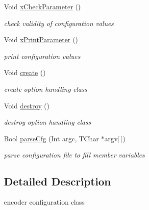\begin{DoxyCompactItemize}
\item 
\mbox{\label{class_t_app_enc_cfg_a6119ea47ef5786407b9fd44decbcac18}} 
Void \hyperlink{class_t_app_enc_cfg_a6119ea47ef5786407b9fd44decbcac18}{x\+Check\+Parameter} ()
\begin{DoxyCompactList}\small\item\em check validity of configuration values \end{DoxyCompactList}\item 
\mbox{\label{class_t_app_enc_cfg_a7c71b043b2008c953ad055ef0aa203bd}} 
Void \hyperlink{class_t_app_enc_cfg_a7c71b043b2008c953ad055ef0aa203bd}{x\+Print\+Parameter} ()
\begin{DoxyCompactList}\small\item\em print configuration values \end{DoxyCompactList}\item 
\mbox{\label{class_t_app_enc_cfg_a24d09f9eb45e738213f1d0f98502944b}} 
Void \hyperlink{class_t_app_enc_cfg_a24d09f9eb45e738213f1d0f98502944b}{create} ()
\begin{DoxyCompactList}\small\item\em create option handling class \end{DoxyCompactList}\item 
\mbox{\label{class_t_app_enc_cfg_add60251d01bc8e366af9286bffaf2763}} 
Void \hyperlink{class_t_app_enc_cfg_add60251d01bc8e366af9286bffaf2763}{destroy} ()
\begin{DoxyCompactList}\small\item\em destroy option handling class \end{DoxyCompactList}\item 
Bool \hyperlink{class_t_app_enc_cfg_acb6272dfc9df18c30b610cd135c08085}{parse\+Cfg} (Int argc, T\+Char $\ast$argv\mbox{[}$\,$\mbox{]})
\begin{DoxyCompactList}\small\item\em parse configuration file to fill member variables \end{DoxyCompactList}\end{DoxyCompactItemize}


\subsection{Detailed Description}
encoder configuration class 

